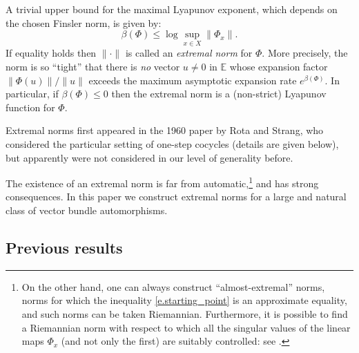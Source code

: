 \documentclass[JEP,XML,SOM,Unicode]{cedram}
\theoremstyle{plain}
\theoremstyle{definition}
\newcommand{\EE}{\mathbb{E}}
\begin{document}
A trivial upper bound for the maximal Lyapunov exponent, which depends on the chosen Finsler norm, is given by:
\begin{equation} \label{e.starting_point}
\beta(\Phi) \le \log \sup_{x \in X} \| \Phi_x \|.
\end{equation}
If equality holds then $\| \mathord{\cdot} \|$ is called an \emph{extremal norm} for $\Phi$.
More precisely, the norm is so ``tight'' that
there is \emph{no} vector $u \neq 0$ in $\EE$ whose expansion factor $\|\Phi(u)\| / \|u\|$ exceeds the maximum asymptotic expansion rate $e^{\beta(\Phi)}$.
In particular, if $\beta(\Phi) \le 0$ then the extremal norm is a (non-strict) Lyapunov function for $\Phi$.

Extremal norms first appeared in the 1960 paper \cite{RS} by Rota and Strang, who considered the particular setting of one-step cocycles (details are given below), but apparently were not considered in our level of generality before.

The existence of an extremal norm is far from automatic,\footnote{On the other hand, one can always construct ``almost-extremal'' norms, \ie norms for which the inequality \eqref{e.starting_point} is an approximate equality, and such norms can be taken Riemannian. Furthermore, it is possible to find a Riemannian norm with respect to which all the singular values of the linear maps $\Phi_x$ (and not only the first) are suitably controlled: see \cite[Prop.\,4.1]{Bochi_ICM}.} and has strong consequences.
In this paper we construct extremal norms for a large and natural
class of vector bundle automorphisms.

\subsection{Previous results}\label{ss.known}
\end{document}
